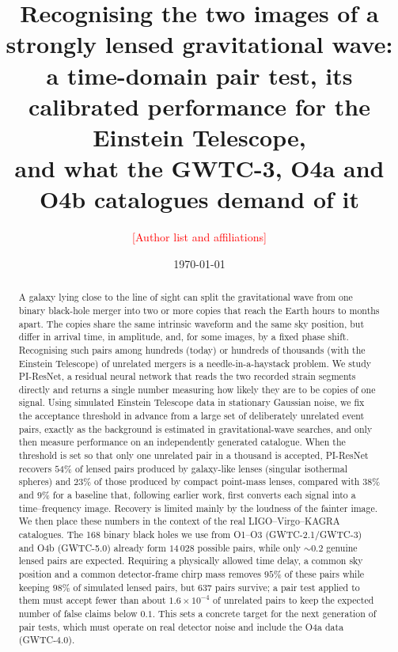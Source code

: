 \documentclass[aps,prd,twocolumn,superscriptaddress,nofootinbib,floatfix]{revtex4-2}
\newcommand{\TBD}[1]{\textcolor{red}{[#1]}}
\newcommand{\PIR}{PI-ResNet}
\begin{document}
\title{Recognising the two images of a strongly lensed gravitational wave:\\
a time-domain pair test, its calibrated performance for the Einstein Telescope,\\
and what the GWTC-3, O4a and O4b catalogues demand of it}

\author{\TBD{Author list and affiliations}}

\date{\today}

\begin{abstract}
A galaxy lying close to the line of sight can split the gravitational wave from one binary black-hole merger into two or more copies that reach the Earth hours to months apart.
The copies share the same intrinsic waveform and the same sky position, but differ in arrival time, in amplitude, and, for some images, by a fixed phase shift.
Recognising such pairs among hundreds (today) or hundreds of thousands (with the Einstein Telescope) of unrelated mergers is a needle-in-a-haystack problem.
We study \PIR{}, a residual neural network that reads the two recorded strain segments directly and returns a single number measuring how likely they are to be copies of one signal.
Using simulated Einstein Telescope data in stationary Gaussian noise, we fix the acceptance threshold in advance from a large set of deliberately unrelated event pairs, exactly as the background is estimated in gravitational-wave searches, and only then measure performance on an independently generated catalogue.
When the threshold is set so that only one unrelated pair in a thousand is accepted, \PIR{} recovers $54\%$ of lensed pairs produced by galaxy-like lenses (singular isothermal spheres) and $23\%$ of those produced by compact point-mass lenses, compared with $38\%$ and $9\%$ for a baseline that, following earlier work, first converts each signal into a time--frequency image.
Recovery is limited mainly by the loudness of the fainter image.
We then place these numbers in the context of the real LIGO--Virgo--KAGRA catalogues.
The 168 binary black holes we use from O1--O3 (GWTC-2.1/GWTC-3) and O4b (GWTC-5.0) already form $14\,028$ possible pairs, while only ${\sim}0.2$ genuine lensed pairs are expected.
Requiring a physically allowed time delay, a common sky position and a common detector-frame chirp mass removes $95\%$ of these pairs while keeping $98\%$ of simulated lensed pairs, but $637$ pairs survive; a pair test applied to them must accept fewer than about $1.6\times10^{-4}$ of unrelated pairs to keep the expected number of false claims below $0.1$.
This sets a concrete target for the next generation of pair tests, which must operate on real detector noise and include the O4a data (GWTC-4.0).
\end{abstract}
\end{document}
